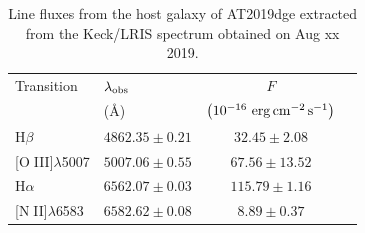 \documentclass[twocolumn]{aastex63}
\def\ion#1#2{#1$\;${\footnotesize\rm{#2}}\relax}
\begin{document}
\begin{CJK*}{UTF8}{gbsn}
\begin{table}[htbp!]
	\caption{Line fluxes from the host galaxy of AT2019dge extracted from the Keck/LRIS spectrum 
	obtained on Aug xx 2019. }\label{tab:eml_host}
	\centering
	\begin{tabular}{llcc}
		\toprule
		Transition			& $\lambda_{\rm obs}$& $F$	\\
		& (\AA)	& $\left(10^{-16}~{\rm erg\,cm}^{-2}\,{\rm s}^{-1}\right) $ \\
		\midrule
		H$\beta$								& $ 4862.35 \pm 0.21	$ &$	32.45 \pm 2.08		$\\%
		{[\ion{O}{III}]}$\lambda$5007				& $5007.06 \pm 0.55$ &$67.56 \pm 13.52	$\\%
		H$\alpha$								&$6562.07 	\pm 0.03$   & $115.79 \pm 1.16	$\\%
		{[\ion{N}{II}]}$\lambda$6583				& $6582.62 \pm 0.08$ &$	8.89 \pm 0.37	$\\%
		\bottomrule
	\end{tabular}
\end{table}



{}


\end{CJK*}
\end{document}
